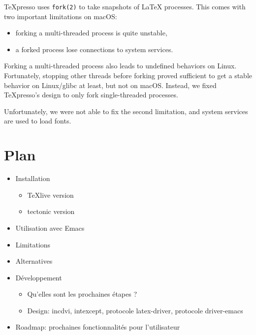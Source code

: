 \documentclass{article}
\begin{document}
TeXpresso uses \texttt{fork(2)} to take snapshots of \LaTeX{} processes. This comes with two important limitations on macOS:
\begin{itemize}
  \item forking a multi-threaded process is quite unstable,
  \item a forked process lose connections to system services.
\end{itemize}

Forking a multi-threaded process also leads to undefined behaviors on Linux. Fortunately, stopping other threads before forking proved sufficient to get a stable behavior on Linux/glibc at least, but not on macOS. Instead, we fixed TeXpresso's design to only fork single-threaded processes. 

Unfortunately, we were not able to fix the second limitation, and system services are used to load fonts.

\section{Plan}
\begin{itemize}
  \item Installation
    \begin{itemize}
      \item \TeX{}live version
      \item tectonic version
    \end{itemize}
  \item Utilisation avec Emacs
  \item Limitations
  \item Alternatives
  \item Développement
    \begin{itemize}
      \item Qu'elles sont les prochaines étapes ?
      \item Design: incdvi, intexcept, protocole latex-driver, protocole driver-emacs
    \end{itemize}
  \item Roadmap: prochaines fonctionnalités pour l'utilisateur
\end{itemize}
\end{document}
